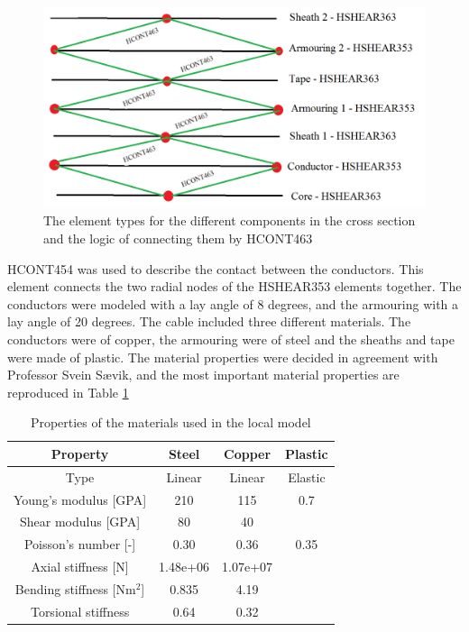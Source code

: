 \begin{figure}[H]
\centering
\includegraphics[scale=0.5]{figures/contact}
\caption[$\; \:$ Logic of HCONT463]{The element types for the different components in the cross section and the logic of connecting them by HCONT463}
 \label{fig:contact}
\end{figure}
HCONT454 was used to describe the contact between the conductors. This element connects the two radial nodes of the HSHEAR353 elements together.\newline
\newline
The conductors were modeled with a lay angle of 8 degrees, and the armouring with a lay angle of 20 degrees. \newline
\newline
The cable included three different materials. The conductors were of copper, the armouring were of steel and the sheaths and tape were made of plastic. The material properties were decided in agreement with Professor Svein Sævik, and the most important material properties are reproduced in Table \ref{table:matprop}
\begin{table} [H]
\centering
\begin{tabular}{ |c|c|c|c|}
\hline
Property &Steel & Copper  & Plastic \\
 \hline
 \hline
Type & Linear & Linear & Elastic\\
Young's modulus [GPA] & 210 & 115 & 0.7\\
Shear modulus [GPA]& 80 & 40 &  \\
Poisson's number [-]& 0.30 & 0.36 & 0.35\\
Axial stiffness [N]& 1.48e+06 & 1.07e+07 & \\
Bending stiffness [Nm$^2$] & 0.835 & 4.19 &\\
Torsional stiffness & 0.64 & 0.32&\\
 \hline
\end{tabular}
\caption{Properties of the materials used in the local model}
\label{table:matprop}
\end{table}
